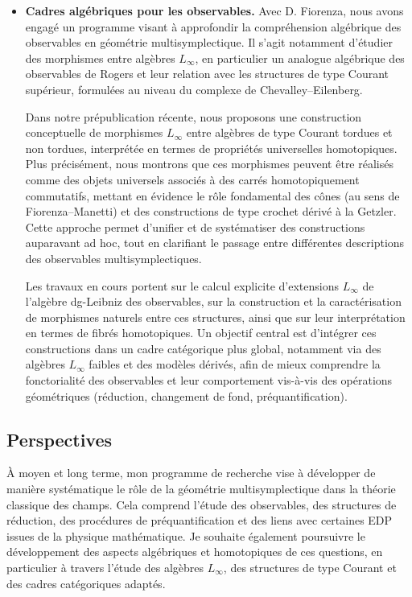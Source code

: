 \documentclass[a4paper]{article}
\begin{document}
\begin{itemize}[noitemsep,topsep=0pt,parsep=0pt,partopsep=0pt]
\item \textbf{Cadres algébriques pour les observables.}
Avec D. Fiorenza, nous avons engagé un programme visant à approfondir la compréhension algébrique des observables en géométrie multisymplectique.
Il s’agit notamment d’étudier des morphismes entre algèbres \(L_\infty\), en particulier un analogue algébrique des observables de Rogers et leur relation avec les structures de type Courant supérieur, formulées au niveau du complexe de Chevalley--Eilenberg.

Dans notre prépublication récente\cite{Fiorenza2026}, nous proposons une construction conceptuelle de morphismes \(L_\infty\) entre algèbres de type Courant tordues et non tordues, interprétée en termes de propriétés universelles homotopiques. Plus précisément, nous montrons que ces morphismes peuvent être réalisés comme des objets universels associés à des carrés homotopiquement commutatifs, mettant en évidence le rôle fondamental des cônes (au sens de Fiorenza--Manetti\cite{Fiorenza2014a}) et des constructions de type crochet dérivé à la Getzler. Cette approche permet d’unifier et de systématiser des constructions auparavant ad hoc, tout en clarifiant le passage entre différentes descriptions des observables multisymplectiques.

Les travaux en cours portent sur le calcul explicite d’extensions \(L_\infty\) de l’algèbre dg-Leibniz des observables, sur la construction et la caractérisation de morphismes naturels entre ces structures, ainsi que sur leur interprétation en termes de fibrés homotopiques. Un objectif central est d’intégrer ces constructions dans un cadre catégorique plus global, notamment via des algèbres \(L_\infty\) faibles et des modèles dérivés, afin de mieux comprendre la fonctorialité des observables et leur comportement vis-à-vis des opérations géométriques (réduction, changement de fond, préquantification).
\end{itemize}

\subsection*{Perspectives}

À moyen et long terme, mon programme de recherche vise à développer de manière systématique le rôle de la géométrie multisymplectique dans la théorie classique des champs. Cela comprend l’étude des observables, des structures de réduction, des procédures de préquantification et des liens avec certaines EDP issues de la physique mathématique. Je souhaite également poursuivre le développement des aspects algébriques et homotopiques de ces questions, en particulier à travers l’étude des algèbres \(L_\infty\), des structures de type Courant et des cadres catégoriques adaptés.
\end{document}
